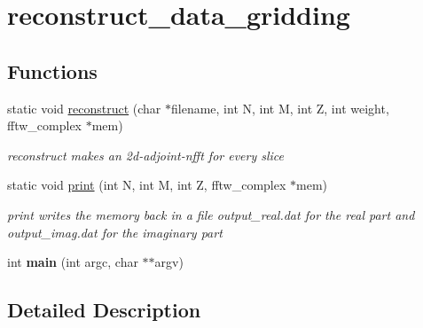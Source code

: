 \hypertarget{group__applications__mri3d__reconstruct__data__gridding}{\section{reconstruct\-\_\-data\-\_\-gridding}
\label{group__applications__mri3d__reconstruct__data__gridding}
}
\subsection*{Functions}
\begin{DoxyCompactItemize}
\item 
\hypertarget{group__applications__mri3d__reconstruct__data__gridding_ga0152e0943d96d847eaaaa8a9f487eb9e}{static void \hyperlink{group__applications__mri3d__reconstruct__data__gridding_ga0152e0943d96d847eaaaa8a9f487eb9e}{reconstruct} (char $\ast$filename, int N, int M, int Z, int weight, fftw\-\_\-complex $\ast$mem)}\label{group__applications__mri3d__reconstruct__data__gridding_ga0152e0943d96d847eaaaa8a9f487eb9e}

\begin{DoxyCompactList}\small\item\em reconstruct makes an 2d-\/adjoint-\/nfft for every slice \end{DoxyCompactList}\item 
\hypertarget{group__applications__mri3d__reconstruct__data__gridding_gaa30709aaef018deecdd911083fadb877}{static void \hyperlink{group__applications__mri3d__reconstruct__data__gridding_gaa30709aaef018deecdd911083fadb877}{print} (int N, int M, int Z, fftw\-\_\-complex $\ast$mem)}\label{group__applications__mri3d__reconstruct__data__gridding_gaa30709aaef018deecdd911083fadb877}

\begin{DoxyCompactList}\small\item\em print writes the memory back in a file output\-\_\-real.\-dat for the real part and output\-\_\-imag.\-dat for the imaginary part \end{DoxyCompactList}\item 
\hypertarget{group__applications__mri3d__reconstruct__data__gridding_ga3c04138a5bfe5d72780bb7e82a18e627}{int {\bfseries main} (int argc, char $\ast$$\ast$argv)}\label{group__applications__mri3d__reconstruct__data__gridding_ga3c04138a5bfe5d72780bb7e82a18e627}

\end{DoxyCompactItemize}


\subsection{Detailed Description}
